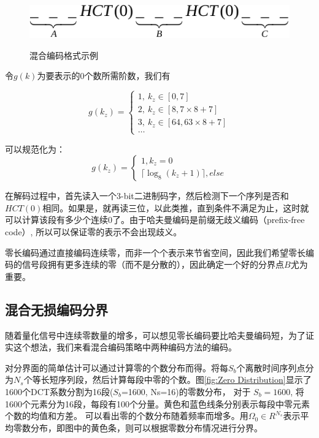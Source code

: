 \begin{figure}[H]
  \centering
  \caption{混合编码格式示例}
  \includegraphics{Pictures/Compression/HCT-crop.pdf}\\
\end{figure}

令$g(k)$为要表示的0个数所需阶数，我们有


\begin{equation*}
  g(k_z)=\left\{
    \begin{array}{lr}
        1,\ k_z\in[0,7]\\
        2,\ k_z\in[8,7\times8+7]\\
        3,\ k_z\in[64,63\times8+7]\\
        \ldots
    \end{array}
  \right.
\end{equation*}


可以规范化为：
\begin{equation}\label{Eq:g(kz) definition}
  g(k_z)=\left\{
    \begin{array}{lr}
        1,k_z=0\\
        \lceil \log_8(k_z+1) \rceil,else
    \end{array}
  \right.
\end{equation}

在解码过程中，首先读入一个3-bit二进制码字，然后检测下一个序列是否和$HCT(0)$相同。如果是，就再读三位，以此类推，直到条件不满足为止，这时就可以计算该段有多少个连续0了。由于哈夫曼编码是前缀无歧义编码（prefix-free code）, 所以可以保证零的表示不会出现歧义。

零长编码通过直接编码连续零，而非一个个表示来节省空间，因此我们希望零长编码的信号段拥有更多连续的零（而不是分散的），因此确定一个好的分界点$B$尤为重要。








\subsection{混合无损编码分界}
随着量化信号中连续零数量的增多，可以想见零长编码要比哈夫曼编码短，为了证实这个想法，我们来看混合编码策略中两种编码方法的编码。

对分界面的简单估计可以通过计算零的个数分布而得。将每$S_b$个离散时间序列点分为$N_s$个等长短序列段，然后计算每段中零的个数。图\ref{fig:Zero Distribution}显示了1600个DCT系数分割为16段($S_b$=1600, Ns=16)的零数分布， 对于 $S_b=1600$, 将1600个元素分为16段，每段有100个分量。黄色和蓝色线条分别表示每段中零元素个数的均值和方差。 可以看出零的个数分布随着频率而增多。用$\Omega_0\in R^{N_s}$表示平均零数分布，即图中的黄色条，则可以根据零数分布情况进行分界。

